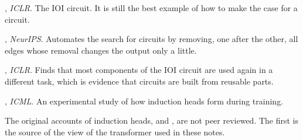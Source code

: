 \begin{readinglist}
\item \citet{wang2023interpretability}, \emph{ICLR}. The IOI circuit. It is still the best example of how to make the case for a
circuit.
\item \citet{conmy2023towards}, \emph{NeurIPS}. Automates the search for circuits by removing, one after the
other, all edges whose removal changes the output only a little.
\item \citet{merullo2024circuit}, \emph{ICLR}. Finds that most components of the IOI circuit are used again in a
different task, which is evidence that circuits are built from reusable parts.
\item \citet{singh2024needs}, \emph{ICML}. An experimental study of how induction heads form during training.
\item The original accounts of induction heads, \citet{elhage2021mathematical} and \citet{olsson2022context},
are not peer reviewed. The first is the source of the view of the transformer used in these notes.
\end{readinglist}

